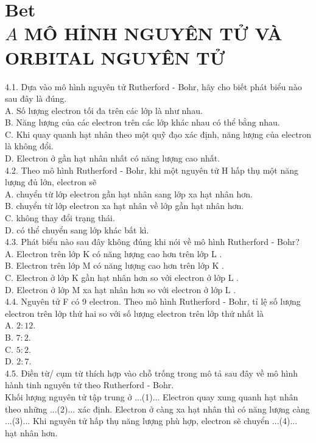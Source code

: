 \documentclass[10pt]{article}
\begin{document}
\section*{Bet \\
 $A$ MÔ HİNH NGUYÊN TỬ VÀ ORBITAL NGUYÊN TỬ}
4.1. Dựa vào mô hình nguyên tử Rutherford - Bohr, hãy cho biết phát biểu nào sau đây là đúng.\\
A. Số lượng electron tối đa trên các lớp là như nhau.\\
B. Năng lượng của các electron trên các lớp khác nhau có thể bằng nhau.\\
C. Khi quay quanh hạt nhân theo một quỹ đạo xác định, năng lượng của electron là không đổi.\\
D. Electron ở gần hạt nhân nhất có năng lượng cao nhất.\\
4.2. Theo mô hình Rutherford - Bohr, khi một nguyên tử H hấp thụ một năng lượng đủ lớn, electron sẽ\\
A. chuyển từ lớp electron gần hạt nhân sang lớp xa hạt nhân hơn.\\
B. chuyển từ lớp electron xa hạt nhân về lớp gần hạt nhân hơn.\\
C. không thay đổi trạng thái.\\
D. có thể chuyển sang lớp khác bất kì.\\
4.3. Phát biểu nào sau đây không đúng khi nói về mô hình Rutherford - Bohr?\\
A. Electron trên lớp K có năng lượng cao hơn trên lớp L .\\
B. Electron trên lớp M có năng lượng cao hơn trên lớp K .\\
C. Electron ở lớp K gần hạt nhân hơn so với electron ở lớp L .\\
D. Electron ở lớp M xa hạt nhân hơn so với electron ở lớp L .\\
4.4. Nguyên tử F có 9 electron. Theo mô hình Rutherford - Bohr, tỉ lệ số lượng electron trên lớp thứ hai so với số lượng electron trên lớp thứ nhất là\\
A. $2: 12$.\\
B. $7: 2$.\\
C. $5: 2$.\\
D. $2: 7$.\\
4.5. Điền từ/ cụm từ thích hợp vào chỗ trống trong mô tả sau đây về mô hình hành tinh nguyên tử theo Rutherford - Bohr.\\
Khối lượng nguyên tử tập trung ở ...(1)... Electron quay xung quanh hạt nhân theo những ...(2)... xác định. Electron ở càng xa hạt nhân thì có năng lượng càng ...(3)... Khi nguyên tử hấp thụ năng lượng phù hợp, electron sẽ chuyển ...(4)... hạt nhân hơn.\\
\end{document}

